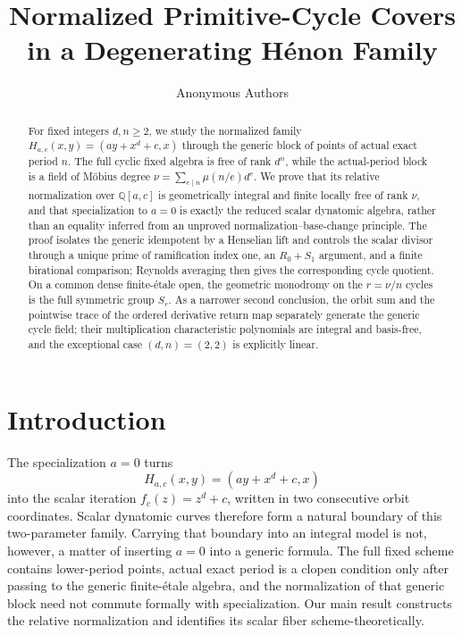 \documentclass[11pt]{article}
\title{Normalized Primitive-Cycle Covers in a Degenerating H\'{e}non Family}
\author{Anonymous Authors}
\date{}
\theoremstyle{definition}
\theoremstyle{remark}
\newcommand{\Q}{\mathbb{Q}}
\newcommand{\etale}{\'{e}tale}
\begin{document}
\maketitle

\begin{abstract}
For fixed integers $d,n\geq2$, we study the normalized family
$H_{a,c}(x,y)=(ay+x^d+c,x)$ through the generic block of points of actual
exact period $n$.  The full cyclic fixed algebra is free of rank $d^n$, while
the actual-period block is a field of M\"obius degree
$\nu=\sum_{e\mid n}\mu(n/e)d^e$.  We prove that its relative normalization
over $\Q[a,c]$ is geometrically integral and finite locally free of rank
$\nu$, and that specialization to $a=0$ is exactly the reduced scalar
dynatomic algebra, rather than an equality inferred from an unproved
normalization--base-change principle.  The proof isolates the generic
idempotent by a Henselian lift and controls the scalar divisor through a
unique prime of ramification index one, an $R_0+S_1$ argument, and a finite
birational comparison; Reynolds averaging then gives the corresponding
cycle quotient.  On a common dense finite-\etale{} open, the geometric
monodromy on the $r=\nu/n$ cycles is the full symmetric group $S_r$.  As a
narrower second conclusion, the orbit sum and the pointwise trace of the
ordered derivative return map separately generate the generic cycle field;
their multiplication characteristic polynomials are integral and
basis-free, and the exceptional case $(d,n)=(2,2)$ is explicitly linear.
\end{abstract}

\section{Introduction}\label{sec:introduction}

The specialization $a=0$ turns
\[
  H_{a,c}(x,y)=(ay+x^d+c,x)
\]
into the scalar iteration $f_c(z)=z^d+c$, written in two consecutive orbit
coordinates.  Scalar dynatomic curves therefore form a natural boundary of
this two-parameter family.  Carrying that boundary into an integral model is
not, however, a matter of inserting $a=0$ into a generic formula.  The full
fixed scheme contains lower-period points, actual exact period is a clopen
condition only after passing to the generic finite-\etale{} algebra, and the
normalization of that generic block need not commute formally with
specialization.  Our main result constructs the relative normalization and
identifies its scalar fiber scheme-theoretically.
\end{document}
